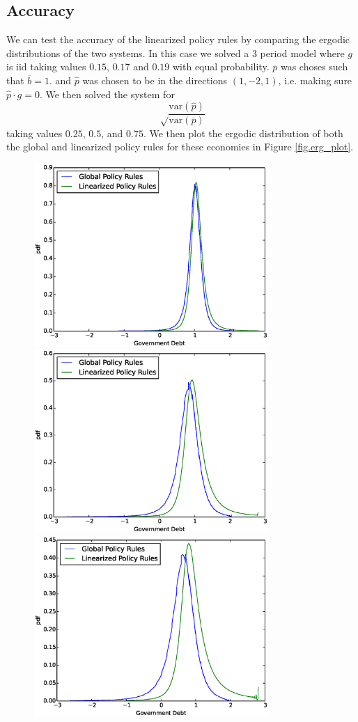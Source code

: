 \documentclass[12pt]{article}
\newcommand{\pbar}{{\overline p}}
\newcommand{\bbar}{{\overline b}}
\newcommand{\var}{{\text{var}}}
\begin{document}
\subsection{Accuracy}
We can test the accuracy of the linearized policy rules by comparing the ergodic distributions of the two systems.  In this case we solved a 3 period model where $g$ is iid taking values $0.15$, $0.17$ and $0.19$ with equal probability.   $\pbar$ was choses such that $\bbar = 1.$ and $\hat p$ was chosen to be in the directions $(1,-2,1)$, i.e. making sure $\hat p \cdot g = 0$.  We then solved the system for 
\[
	\sqrt\frac{\var (\hat p)}{\var (\pbar)}
\]taking values $0.25$, $0.5$, and $0.75$.  We then plot the ergodic distribution of both the global and linearized policy rules for these economies in Figure \ref{fig.erg_plot}.
\begin{figure}[ht]
	\includegraphics[width=3.5in]{Images/erg1.eps}
	\includegraphics[width=3.5in]{Images/erg2.eps}
	\includegraphics[width=3.5in]{Images/erg3.eps}

\end{figure}
\end{document}
